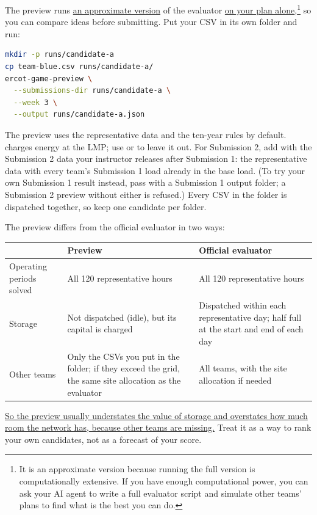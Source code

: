 \documentclass[10pt]{article}
\newcommand{\alert}[1]{{\color{alertblue}\uline{#1}}}
\newcommand{\code}[1]{\path{#1}}
\begin{document}
The preview runs \alert{an approximate version} of the evaluator \alert{on your plan alone},\footnote{It is an approximate version because running the full version is computationally extensive. If you have enough computational power, you can ask your AI agent to write a full evaluator script and simulate other teams' plans to find what is the best you can do.} so you can compare ideas before submitting. Put your CSV in its own folder and
run:
\begin{lstlisting}[language=bash]
mkdir -p runs/candidate-a
cp team-blue.csv runs/candidate-a/
ercot-game-preview \
  --submissions-dir runs/candidate-a \
  --week 3 \
  --output runs/candidate-a.json
\end{lstlisting}
The preview uses the representative data and the ten-year rules by default.
\code{--week 3} charges energy at the LMP; use \code{--week 1} or \code{--week 2}
to leave it out. For Submission 2, add \code{--artifact-dir} with the
Submission 2 data your instructor releases after Submission 1: the
representative data with every team's Submission 1 load already in the base
load. (To try your own Submission 1 result instead, pass
\code{--base-load-from} with a Submission 1 output folder; a Submission 2
preview without either is refused.) Every CSV in the folder is dispatched together, so keep one candidate per
folder.

The preview differs from the official evaluator in two ways:

\begin{center}
\begin{tabularx}{\linewidth}{@{}l X X@{}}
\toprule
 & Preview & Official evaluator\\
\midrule
Operating periods solved & All 120 representative hours & All 120 representative hours\\
Storage & Not dispatched (idle), but its capital is charged & Dispatched within each representative day; half full at the start and end of each day\\
Other teams & Only the CSVs you put in the folder; if they exceed the grid, the same site allocation as the evaluator & All teams, with the site allocation if needed\\
\bottomrule
\end{tabularx}
\end{center}

\alert{So the preview usually understates the value of storage and overstates how
much room the network has, because other teams are missing.} Treat it as a way
to rank your own candidates, not as a forecast of your score.
\end{document}
